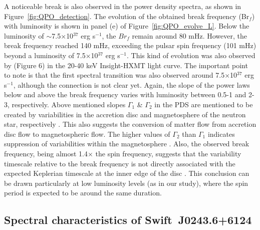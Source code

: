 \documentclass[twocolumn,trackchanges]{aastex631}
\begin{document}
A noticeable break is also observed in the power density spectra, as shown in Figure~\ref{fig:QPO_detection}. The evolution of the obtained break frequency (Br$_{f}$) with luminosity is shown in panel (e) of Figure~\ref{fig:QPO_evolve_L}.  Below the luminosity of $\sim$7.5$\times$10$^{37}$ erg s$^{-1}$, the $Br_{f}$ remain around 80 mHz. However, the break frequency reached 140 mHz, exceeding the pulsar spin frequency (101 mHz) beyond a luminosity of 7.5$\times$10$^{37}$ erg s$^{-1}$. This kind of evolution was also observed by  \citealt{2020MNRAS.491.1857D} (Figure 6) in the 20-40 keV Insight-HXMT light curve. The important point to note is that the first spectral transition was also observed around 7.5$\times$10$^{37}$ erg s$^{-1}$, although the connection is not clear yet. Again, the slope of the power laws below and above the break frequency varies with luminosity between 0.5-1 and  2-3, respectively. Above mentioned slopes $\Gamma_{1}$ \& $\Gamma_{2}$ in the PDS are mentioned to be created by variabilities in the accretion disc and magnetosphere of the neutron star, respectively \citep{1993ApJ...411L..79H, 2009A&A...507.1211R}.  This also suggests the conversion of matter flow from accretion disc flow to magnetospheric flow.  The higher values of $\Gamma_{2}$ than $\Gamma_{1}$ indicates suppression of  variabilities within the magnetosphere \citep{2009A&A...507.1211R}. Also, the observed break frequency, being almost 1.4$\times$ the spin frequency, suggests that the variability timescale relative to the break frequency is not directly associated with the expected Keplerian timescale at the inner edge of the disc \citep{2009A&A...507.1211R}. This conclusion can be drawn particularly at low luminosity levels (as in our study), where the spin period is expected to be around the same duration.



\subsection{Spectral characteristics of Swift~J0243.6+6124}
\end{document}
